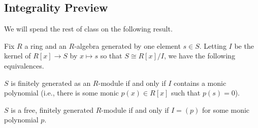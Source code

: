 \subsection{Integrality Preview}
We will spend the rest of class on the following result.
\begin{prop}
	Fix $R$ a ring and an $R$-algebra generated by one element $s\in S$. Letting $I$ be the kernel of $R[x]\to S$ by $x\mapsto s$ so that $S\cong R[x]/I$, we have the following equivalences.
	\begin{listalph}
		\item $S$ is finitely generated as an $R$-module if and only if $I$ contains a monic polynomial (i.e., there is some monic $p(x)\in R[x]$ such that $p(s)=0$).
		\item $S$ is a free, finitely generated $R$-module if and only if $I=(p)$ for some monic polynomial $p$.
	\end{listalph}
\end{prop}
